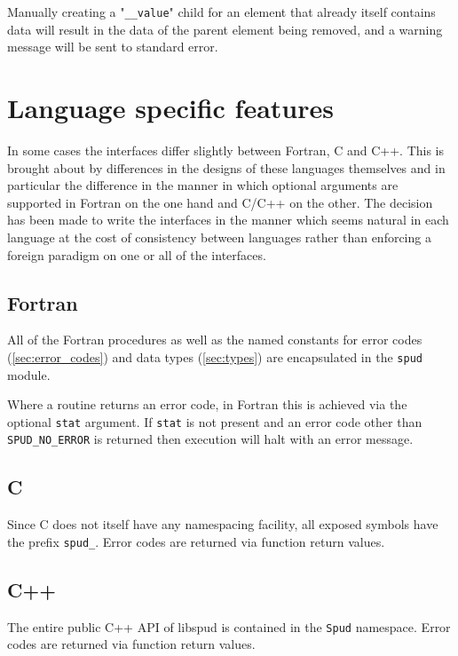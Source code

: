 \documentclass[a4paper, 11pt]{book}
\newcommand{\stat}{\lstinline[language=fortran]+stat+\xspace}
\begin{document}
Manually creating a "\verb+__value+" child for an element that already itself
contains data will result in the data of the parent element being removed, and
a warning message will be sent to standard error.


\section{Language specific features}

In some cases the interfaces differ slightly between Fortran, C and C++.
This is brought about by differences in the designs of these languages
themselves and in particular the difference in the manner in which optional
arguments are supported in Fortran on the one hand and C/C++ on the other.
The decision has been made to write the interfaces in the manner which seems
natural in each language at the cost of consistency between languages rather
than enforcing a foreign paradigm on one or all of the interfaces.

\subsection{Fortran}

All of the Fortran procedures as well as the named constants for error codes
(\ref{sec:error_codes}) and data types
(\ref{sec:types})  are encapsulated in the \lstinline+spud+ module.

Where a routine returns an error code, in Fortran this is achieved via the
optional \stat argument. If \stat is not present and an error code other
than \lstinline[language=fortran]+SPUD_NO_ERROR+ is returned then execution
will halt with an error message.

\subsection{C}

Since C does not itself have any namespacing facility, all exposed symbols
have the prefix \lstinline[language=C]+spud_+. Error codes are returned via
function return values.

\subsection{C++}

The entire public C++ API of libspud is contained in the
\lstinline[language=C++]+Spud+ namespace. Error codes are returned via function
return values.
\end{document}
